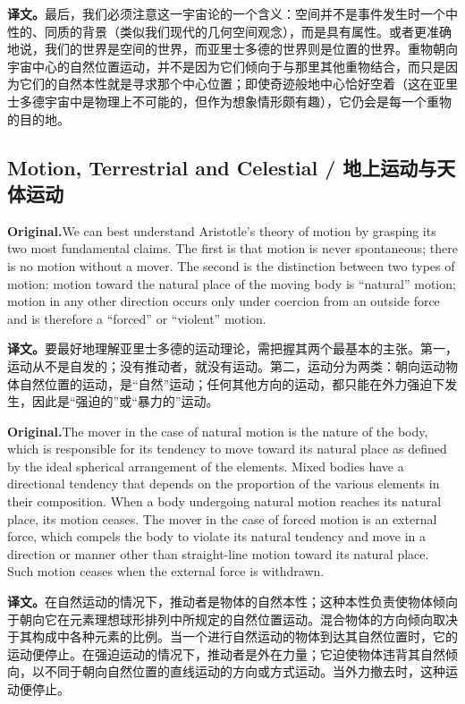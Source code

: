 \documentclass[UTF8]{ctexart}
\newcommand{\orig}{\par\noindent\textbf{Original.}\quad}
\newcommand{\zh}{\par\noindent\textbf{译文。}\quad}
\begin{document}
\zh 最后，我们必须注意这一宇宙论的一个含义：空间并不是事件发生时一个中性的、同质的背景（类似我们现代的几何空间观念），而是具有属性。或者更准确地说，我们的世界是空间的世界，而亚里士多德的世界则是位置的世界。重物朝向宇宙中心的自然位置运动，并不是因为它们倾向于与那里其他重物结合，而只是因为它们的自然本性就是寻求那个中心位置；即使奇迹般地中心恰好空着（这在亚里士多德宇宙中是物理上不可能的，但作为想象情形颇有趣），它仍会是每一个重物的目的地。

\subsection*{Motion, Terrestrial and Celestial / 地上运动与天体运动}

\orig We can best understand Aristotle's theory of motion by grasping its two most fundamental claims. The first is that motion is never spontaneous; there is no motion without a mover. The second is the distinction between two types of motion: motion toward the natural place of the moving body is ``natural'' motion; motion in any other direction occurs only under coercion from an outside force and is therefore a ``forced'' or ``violent'' motion.

\zh 要最好地理解亚里士多德的运动理论，需把握其两个最基本的主张。第一，运动从不是自发的；没有推动者，就没有运动。第二，运动分为两类：朝向运动物体自然位置的运动，是“自然”运动；任何其他方向的运动，都只能在外力强迫下发生，因此是“强迫的”或“暴力的”运动。

\orig The mover in the case of natural motion is the nature of the body, which is responsible for its tendency to move toward its natural place as defined by the ideal spherical arrangement of the elements. Mixed bodies have a directional tendency that depends on the proportion of the various elements in their composition. When a body undergoing natural motion reaches its natural place, its motion ceases. The mover in the case of forced motion is an external force, which compels the body to violate its natural tendency and move in a direction or manner other than straight-line motion toward its natural place. Such motion ceases when the external force is withdrawn.

\zh 在自然运动的情况下，推动者是物体的自然本性；这种本性负责使物体倾向于朝向它在元素理想球形排列中所规定的自然位置运动。混合物体的方向倾向取决于其构成中各种元素的比例。当一个进行自然运动的物体到达其自然位置时，它的运动便停止。在强迫运动的情况下，推动者是外在力量；它迫使物体违背其自然倾向，以不同于朝向自然位置的直线运动的方向或方式运动。当外力撤去时，这种运动便停止。
\end{document}
